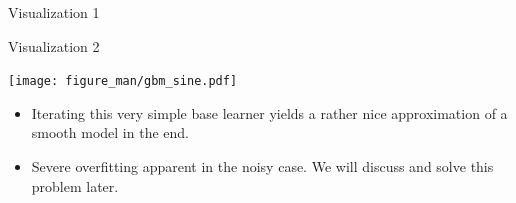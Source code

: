 \begin{frame}{Visualization 1}
\begin{center}
\end{center}

\end{frame}


\begin{vbframe}{Visualization 2}

\vspace{-0.6cm}
\begin{center}
\texttt{[image: figure\_man/gbm\_sine.pdf]}
\end{center}

\vspace{-0.8cm}
\footnotesize
\begin{itemize}

  \item
    Iterating this very simple base learner yields a rather nice approximation of a smooth model in the end.

  \item
    Severe overfitting apparent in the noisy case. We will discuss and solve this problem later.

\end{itemize}

\end{vbframe}


